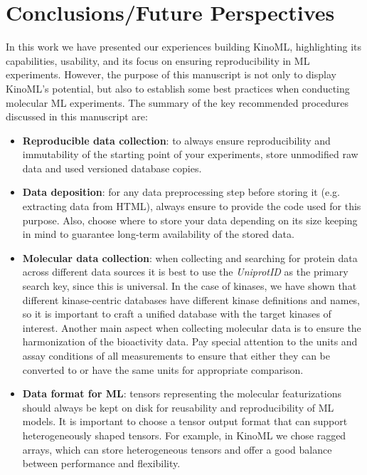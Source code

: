 \documentclass[9pt,lessons, pubversion]{livecoms}
\begin{document}
\section{Conclusions/Future Perspectives}
In this work we have presented our experiences building KinoML, highlighting its capabilities, usability, and its focus on ensuring reproducibility in ML experiments. However, the purpose of this manuscript is not only to display KinoML's potential, but also to establish some best practices when conducting molecular ML experiments. The summary of the key recommended procedures discussed in this manuscript are: 
\begin{itemize}
    \item \textbf{Reproducible data collection}: to always ensure reproducibility and immutability of the starting point of your experiments, store unmodified raw data and used versioned database copies. 
    \item \textbf{Data deposition}: for any data preprocessing step before storing it (e.g. extracting data from HTML), always ensure to provide the code used for this purpose. Also, choose where to store your data depending on its size keeping in mind to guarantee long-term availability of the stored data.
    \item \textbf{Molecular data collection}: when collecting and searching for protein data across different data sources it is best to use the \textit{UniprotID} as the primary search key, since this is universal. In the case of kinases, we have shown that different kinase-centric databases have different kinase definitions and names, so it is important to craft a unified database with the target kinases of interest. 
    Another main aspect when collecting molecular data is to ensure the harmonization of the bioactivity data. Pay special attention to the units and assay conditions of all measurements to ensure that either they can be converted to or have the same units for appropriate comparison.
    \item \textbf{Data format for ML}: tensors representing the molecular featurizations should always be kept on disk for reusability and reproducibility of ML models. It is important to choose a tensor output format that can support heterogeneously shaped tensors. For example, in KinoML we chose ragged arrays, which can store heterogeneous tensors and offer a good balance between performance and flexibility.
\end{itemize}
\end{document}
